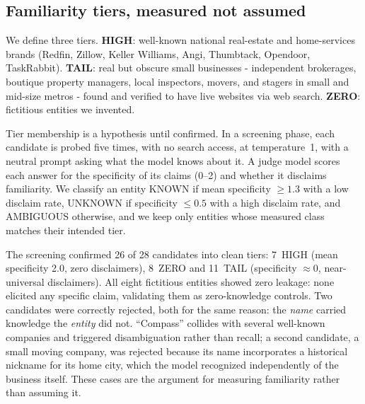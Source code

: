 \documentclass[11pt]{article}
\begin{document}
\subsection{Familiarity tiers, measured not assumed}
We define three tiers. \textbf{HIGH}: well-known national real-estate and home-services brands
(Redfin, Zillow, Keller Williams, Angi, Thumbtack, Opendoor, TaskRabbit). \textbf{TAIL}: real but
obscure small businesses - independent brokerages, boutique property managers, local inspectors,
movers, and stagers in small and mid-size metros - found and verified to have live websites via web
search. \textbf{ZERO}: fictitious entities we invented.

Tier membership is a hypothesis until confirmed. In a screening phase, each candidate is probed five
times, with no search access, at temperature~1, with a neutral prompt asking what the model knows
about it. A judge model scores each answer for the specificity of its claims (0--2) and whether it
disclaims familiarity. We classify an entity KNOWN if mean specificity $\geq 1.3$ with a low
disclaim rate, UNKNOWN if specificity $\leq 0.5$ with a high disclaim rate, and AMBIGUOUS otherwise,
and we keep only entities whose measured class matches their intended tier.

The screening confirmed 26 of 28 candidates into clean tiers: 7~HIGH (mean specificity 2.0, zero
disclaimers), 8~ZERO and 11~TAIL (specificity ${\approx}0$, near-universal disclaimers). All eight
fictitious entities showed zero leakage: none elicited any specific claim, validating them as
zero-knowledge controls. Two candidates were correctly rejected, both for the same reason: the
\emph{name} carried knowledge the \emph{entity} did not. ``Compass'' collides with several
well-known companies and triggered disambiguation rather than recall; a second candidate, a small
moving company, was rejected because its name incorporates a historical nickname for its home city,
which the model recognized independently of the business itself. These cases are the argument for
measuring familiarity rather than assuming it.
\end{document}
